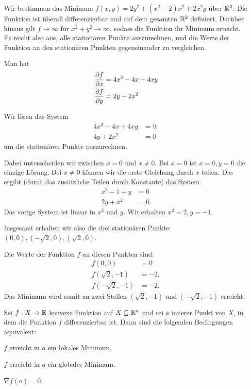 \begin{bsp}
	Wir bestimmen das Minimum 
	$f(x,y) = 2 y^2  + (x^2-2) x^2 + 2 x^2 y$ über $\mathbb{R}^2$. Die Funktion ist überall differenzierbar und auf dem gesamten $\mathbb{R}^2$ definiert. Darüber hinaus gilt $f \to \infty$ für $x^2 + y^2 \to \infty$, sodass die Funktion ihr Minimum erreicht.  Es reicht also aus, alle stationären Punkte auszurechnen, und die Werte der Funktion an den stationären Punkten gegeneinander zu vergleichen. 
	
	Man hat
	\begin{align*}
		\frac{\partial f}{\partial x} & = 4 x^3 - 4 x + 4 x y
		\\ \frac{\partial f}{\partial y} & = 2 y + 2 x^2
	\end{align*} 
	
	Wir lösen das System 
	\begin{align*} 
		4 x^3 - 4 x + 4 x y& = 0,
		\\ 4 y + 2 x^2 & = 0
	\end{align*} 
	um die stationären Punkte auszurechnen. 
	
	Dabei unterscheiden wir zwischen $x = 0$ und $x \ne 0$. Bei $x=0$ ist $x=0,y=0$ die einzige Lösung. Bei $x \ne 0$ können wir die erste Gleichung durch $ x$ teilen. Das ergibt (durch das zusätzliche Teilen durch Konstante) das System. 
	\begin{align*}
		x^2 - 1 +  y & = 0 
	\\	2 y + x^2 & =0. 
	\end{align*} 
	Das vorige System ist linear in $x^2$ und $y$. Wir erhalten $x^2 = 2, y = -1$. 
	
	Insgesamt erhalten wir also die drei stationären Punkte: $(0,0), (- \sqrt{2},0), (\sqrt{2},0)$. 
	
	Die Werte der Funktion $f$ an diesen Punkten sind: 
	\begin{align*}
		f(0,0) & = 0
		\\ f(\sqrt{2},-1) & =  -2,
		\\ f(-\sqrt{2},-1) & = -2.
	\end{align*} 
	Das Minimum wird somit an zwei Stellen $(\sqrt{2}, -1)$ und $(-\sqrt{2},-1)$ erreicht. 
\end{bsp} 


\begin{thm} 
	Sei $f : X \to \mathbb{R}$ konvexe Funktion auf $X \subseteq \mathbb{R}^n$ und sei $a$ innerer Punkt von $X$, in dem die Funktion $f$ differenzierbar ist. Dann sind die folgenden Bedingungen äquivalent: 
	\begin{enuma}
		\item $f$ erreicht in $a$ ein lokales Minimum. 
		\item $f$ erreicht in $a$ ein globales Minimum. 
		\item $\nabla f(a) = 0$. 
	\end{enuma} 
\end{thm} 



